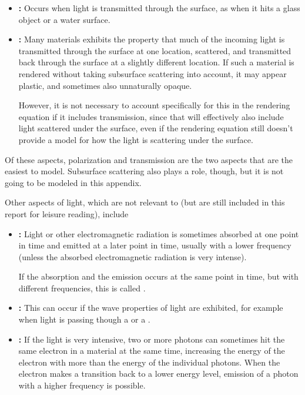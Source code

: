 {\begin{itemize}
\item \textbf{:} Occurs when light is transmitted through the surface, as when it hits a glass object or a water surface.

\item \textbf{:} Many materials exhibits the property that much of the incoming light is transmitted through the surface at one location, scattered, and transmitted back through the surface at a slightly different location. If such a material is rendered without taking subsurface scattering into account, it may appear plastic, and sometimes also unnaturally opaque.

However, it is not necessary to account specifically for this in the rendering equation if it includes transmission, since that will effectively also include light scattered under the surface, even if the rendering equation still doesn't provide a model for how the light is scattering under the surface.
\end{itemize}

Of these aspects, polarization and transmission are the two aspects that are the easiest to model. Subsurface scattering also plays a role, though, but it is not going to be modeled in this appendix.

Other aspects of light, which are not relevant to \surfacewaterrendering (but are still included in this report for leisure reading), include

\begin{itemize}
\item \textbf{:} Light or other electromagnetic radiation is sometimes absorbed at one point in time and emitted at a later point in time, usually with a lower frequency (unless the absorbed electromagnetic radiation is very intense).

If the absorption and the emission occurs at the same point in time, but with different frequencies, this is called .
    
\item \textbf{:} This can occur if the wave properties of light are exhibited, for example when light is passing though a  or a .
    
\item \textbf{:} If the light is very intensive, two or more photons can sometimes hit the same electron in a material at the same time, increasing the energy of the electron with more than the energy of the individual photons. When the electron makes a transition back to a lower energy level, emission of a photon with a higher frequency is possible.
    

\end{itemize}}
